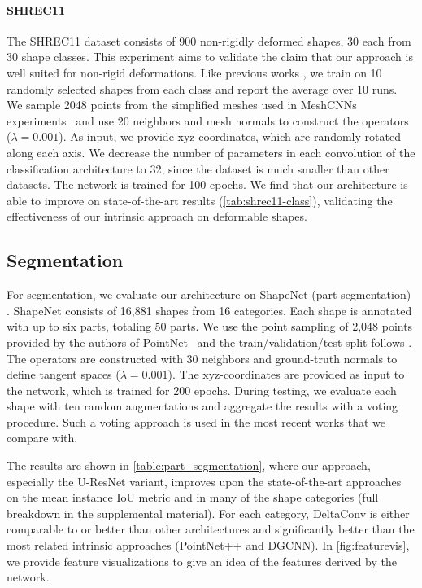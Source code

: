 \documentclass[acmtog, authorversion]{acmart}
\begin{document}
\paragraph{SHREC11}
The SHREC11 dataset \cite{lian2011} consists of 900 non-rigidly deformed shapes, 30 each from 30 shape classes. This experiment aims to validate the claim that our approach is well suited for non-rigid deformations. Like previous works \cite{hanocka2019meshcnn, Wiersma2020, Sharp2020DiffusionIA}, we train on 10 randomly selected shapes from each class and report the average over 10 runs. We sample 2048 points from the simplified meshes used in MeshCNNs experiments~\cite{hanocka2019meshcnn} and use 20 neighbors and mesh normals to construct the operators ($\lambda = 0.001$). As input, we provide xyz-coordinates, which are randomly rotated along each axis. We decrease the number of parameters in each convolution of the classification architecture to 32, since the dataset is much smaller than other datasets. The network is trained for 100 epochs. We find that our architecture is able to improve on state-of-the-art results (\autoref{tab:shrec11-class}), validating the effectiveness of our intrinsic approach on deformable shapes.

\subsection{Segmentation}
For segmentation, we evaluate our architecture on ShapeNet (part segmentation) \cite{yi2016}.
ShapeNet consists of 16,881 shapes from 16 categories. Each shape is annotated with up to six parts, totaling 50 parts. We use the point sampling of 2,048 points provided by the authors of PointNet~\cite{Qi2017a} and the train/validation/test split follows \cite{Chang2015ShapeNet}. The operators are constructed with 30 neighbors and ground-truth normals to define tangent spaces ($\lambda=0.001$). The xyz-coordinates are provided as input to the network, which is trained for 200 epochs. During testing, we evaluate each shape with ten random augmentations and aggregate the results with a voting procedure. Such a voting approach is used in the most recent works that we compare with.

The results are shown in \autoref{table:part_segmentation}, where our approach, especially the U-ResNet variant, improves upon the state-of-the-art approaches on the mean instance IoU metric and in many of the shape categories (full breakdown in the supplemental material). For each category, DeltaConv is either comparable to or better than other architectures and significantly better than the most related intrinsic approaches (PointNet++ and DGCNN). In \autoref{fig:featurevis}, we provide feature visualizations to give an idea of the features derived by the network.
\end{document}
